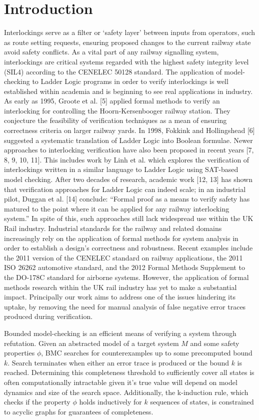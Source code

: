 \documentclass[runningheads]{llncs}
\begin{document}
\section{Introduction}
Interlockings serve as a filter or ‘safety layer’ between inputs from operators, such as route setting requests, ensuring proposed changes to the current railway state avoid safety conflicts. As a vital part of any railway signalling system, interlockings are critical systems regarded with the highest safety integrity level
(SIL4) according to the CENELEC 50128 standard. The application of model-checking
to Ladder Logic programs in order to verify interlockings is well established within
academia and is beginning to see real applications in industry. As early as 1995, Groote
et al. [5] applied formal methods to verify an interlocking for controlling the Hoorn-Kersenbooger railway station. They conjecture the feasibility of verification techniques
as a mean of ensuring correctness criteria on larger railway yards. In 1998, Fokkink
and Hollingshead [6] suggested a systematic translation of Ladder Logic into Boolean
formulae. Newer approaches to interlocking verification have also been proposed in recent
years [7, 8, 9, 10, 11]. This includes work by Linh et al. which explores the verification
of interlockings written in a similar language to Ladder Logic using SAT-based model
checking. After two decades of research, academic work [12, 13] has shown that verification
approaches for Ladder Logic can indeed scale; in an industrial pilot, Duggan et al. [14]
conclude: “Formal proof as a means to verify safety has matured to the point where it
can be applied for any railway interlocking system.” In spite of this, such approaches
still lack widespread use within the UK Rail industry. Industrial standards for the railway and related domains increasingly rely on the application of formal methods for system analysis in order to establish a design’s correctness and robustness. Recent examples include the 2011 version of the CENELEC standard on railway applications, the 2011 ISO 26262 automotive standard, and the 2012 Formal Methods Supplement to the DO-178C standard for airborne systems. However, the application of formal methods research within the UK rail industry has yet to make a substantial impact. Principally our work aims to address one of the issues hindering its uptake, by removing the need for manual analysis of false negative error traces produced during verification.

Bounded model-checking is an efficient means of verifying a system through refutation. Given an abstracted model of a target system $M$ and some safety properties $\phi$, BMC searches for counterexamples up to some precomputed bound $k$. Search terminates when either an error trace is produced or the bound $k$ is reached. Determining this completeness threshold to sufficiently cover all states is often computationally intractable given it's true value will depend on model dynamics and size of the search space. Additionally, the k-induction rule, which checks if the property $\phi$ holds inductively for $k$ sequences of states, is constrained to acyclic graphs for guarantees of completeness. 
\end{document}
